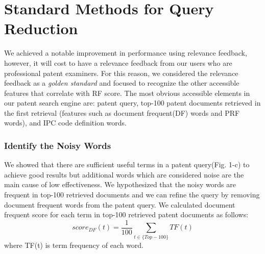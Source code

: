 \documentclass{sig-alternate}
\begin{document}
\section{Standard Methods for Query Reduction}
We achieved a notable improvement in performance using relevance feedback, however, it will cost to have a relevance feedback from our users who are professional patent examiners. For this reason, we considered the relevance feedback as a {\em golden standard} and focused to recognize the other accessible features that correlate with RF score. The most obvious accessible elements in our patent search engine are: patent query, top-100 patent documents retrieved in the first retrieval (features such as document frequent(DF) words and PRF words), and IPC code definition words.  
\subsubsection{Identify the Noisy Words}
We showed that there are sufficient useful terms in a patent query(Fig. 1-c) to achieve good results but additional words which are considered noise are the main cause of low effectiveness. We hypothesized that the noisy words are frequent in top-100 retrieved documents and we can refine the query by removing document frequent words from the patent query. We calculated document frequent score for each term in top-100 retrieved patent documents as follows:
\begin{equation}
score_{DF}(t)= \frac{1}{100}\sum_{t\in \lbrace Top-100\rbrace} TF(t)  
 \label{eq:dfscore}
\end{equation}
where TF(t) is term frequency of each word. 
\end{document}
